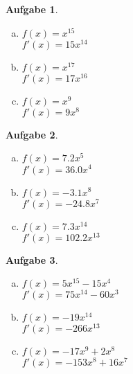 \documentclass[12pt]{article}
\theoremstyle{note}
\newtheorem{aufgabe}{Aufgabe}
\begin{document}
\begin{flushleft}
\begin{aufgabe} ~ \ 
\begin{multicols}{3} 
\begin{enumerate}[a)] 
\item $f(x)=$$x^{15}$\\
$f'(x)=$$15 x^{14}$

\item $f(x)=$$x^{17}$\\
$f'(x)=$$17 x^{16}$

\item $f(x)=$$x^{9}$\\
$f'(x)=$$9 x^{8}$

\end{enumerate} 
\end{multicols} 
\end{aufgabe}\vspace{1em}\begin{aufgabe} ~ \ 
\begin{multicols}{3} 
\begin{enumerate}[a)] 
\item $f(x)=$$7.2 x^{5}$\\
$f'(x)=$$36.0 x^{4}$

\item $f(x)=$$- 3.1 x^{8}$\\
$f'(x)=$$- 24.8 x^{7}$

\item $f(x)=$$7.3 x^{14}$\\
$f'(x)=$$102.2 x^{13}$

\end{enumerate} 
\end{multicols} 
\end{aufgabe}\vspace{1em}\begin{aufgabe} ~ \ 
\begin{multicols}{3} 
\begin{enumerate}[a)] 
\item $f(x)=$$5 x^{15} - 15 x^{4}$\\
$f'(x)=$$75 x^{14} - 60 x^{3}$

\item $f(x)=$$- 19 x^{14}$\\
$f'(x)=$$- 266 x^{13}$

\item $f(x)=$$- 17 x^{9} + 2 x^{8}$\\
$f'(x)=$$- 153 x^{8} + 16 x^{7}$


\end{enumerate}
\end{multicols}
\end{aufgabe}
\end{flushleft}
\end{document}
